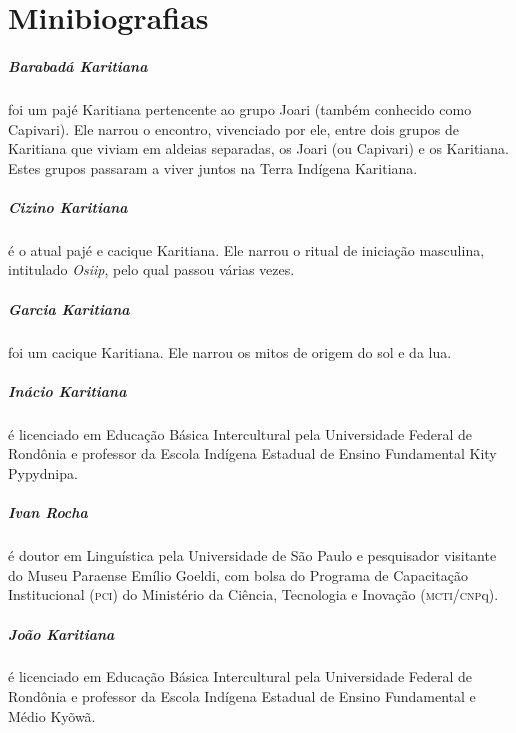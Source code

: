 \chapter{Minibiografias}

\paragraph{Barabadá Karitiana} foi um pajé Karitiana pertencente ao grupo Joari
(também conhecido como Capivari). Ele narrou o encontro, vivenciado por
ele, entre dois grupos de Karitiana que viviam em aldeias separadas, os
Joari (ou Capivari) e os Karitiana. Estes grupos passaram a viver juntos
na Terra Indígena Karitiana.

\paragraph{Cizino Karitiana} é o atual pajé e cacique Karitiana. Ele narrou o ritual
de iniciação masculina, intitulado \emph{Osiip}, pelo qual passou várias
vezes.

\paragraph{Garcia Karitiana} foi um cacique Karitiana. Ele narrou os mitos de origem
do sol e da lua.

\paragraph{Inácio Karitiana} é licenciado em Educação Básica Intercultural pela
Universidade Federal de Rondônia e professor da Escola Indígena Estadual
de Ensino Fundamental Kity Pypydnipa.

\paragraph{Ivan Rocha} é doutor em Linguística pela Universidade de São Paulo e
pesquisador visitante do Museu Paraense Emílio Goeldi, com bolsa do
Programa de Capacitação Institucional (\textsc{pci}) do Ministério da Ciência,
Tecnologia e Inovação (\textsc{mcti}/\textsc{cnp}q).

\paragraph{João Karitiana} é licenciado em Educação Básica Intercultural pela
Universidade Federal de Rondônia e professor da Escola Indígena Estadual
de Ensino Fundamental e Médio Kyõwã.

